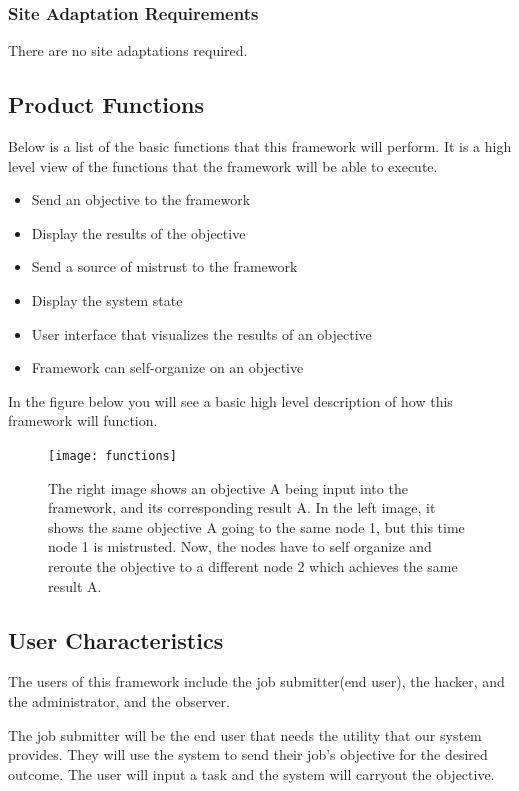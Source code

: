 \documentclass[draftclsnofoot, onecolumn, compsoc, 10pt]{IEEEtran}
\begin{document}
\subsubsection{Site Adaptation Requirements}
There are no site adaptations required.


\subsection{Product Functions}
Below is a list of the basic functions that this framework will perform. It is a high level view of the functions that the framework will be able to execute.
\begin{itemize}
\item Send an objective to the framework
\item Display the results of the objective
\item Send a source of mistrust to the framework
\item Display the system state 
\item User interface that visualizes the results of an objective
\item Framework can self-organize on an objective
\end{itemize}
In the figure below you will see a basic high level description of how this framework will function.
\begin{figure}[!htb]
  \centering
    \texttt{[image: functions]}
  \caption{The right image shows an objective A being input into the framework, and its corresponding result A. In the left image, it shows the same objective A going to the same node 1, but this time node 1 is mistrusted. Now, the nodes have to self organize and reroute the objective to a different node 2 which achieves the same result A. }
\end{figure}
\FloatBarrier

\subsection{User Characteristics} 

The users of this framework include the job submitter(end user), the hacker, and the administrator, and the observer.

The job submitter will be the end user that needs the utility that our system provides. They will use the system to send their job's objective for the desired outcome. The user will input a task and the system will carryout the objective.
\end{document}
